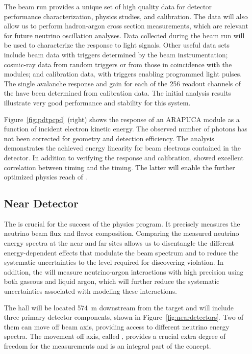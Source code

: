 The  beam run provides a unique set of high quality data for detector performance characterization, physics studies, and calibration. The data will also
allow us to perform hadron-argon cross section measurements, which are relevant for future  neutrino oscillation analyses.
Data collected during the beam run will be used to characterize the  response to light signals. Other useful data sets include
beam data with triggers determined by the beam instrumentation; cosmic-ray data  from random triggers or from those in coincidence with the  modules; and calibration data, with triggers enabling programmed light pulses. 
The single avalanche response and gain for each of the 256 readout channels of the  have been determined from calibration data.
The initial analysis results illustrate very good performance and stability for this system.

Figure~\ref{fig:pdtpcpd} (right) shows the response of an %
ARAPUCA  module as a function of incident electron kinetic energy.
The observed number of photons has not been corrected for geometry and detection efficiency. The analysis demonstrates the achieved energy linearity for beam electrons contained in the detector.  
In addition to verifying the  response and calibration,  showed excellent correlation between  timing and the  timing. The latter will enable the further optimized physics reach of . 


\subsection{Near Detector}
\label{sec:nd-verview}


The   is crucial for the success of the  physics program. It precisely measures the neutrino beam flux and flavor composition. Comparing the measured neutrino energy spectra at the near and far sites allows us to disentangle the different energy-dependent effects that modulate the beam spectrum and to reduce the systematic uncertainties to the level required for discovering  violation. In addition, the  will measure neutrino-argon interactions with high precision using both gaseous and liquid argon, which will further reduce the systematic uncertainties associated with modeling these interactions.


The  hall will be located \SI{574}{m} downstream from the target and will include three primary detector components, shown in Figure~\ref{fig:neardetectors}. Two of them can move off beam axis, providing access to different neutrino energy spectra. The movement off axis, called , provides a crucial extra degree of freedom for the  measurements and is an integral part of the   concept. 


